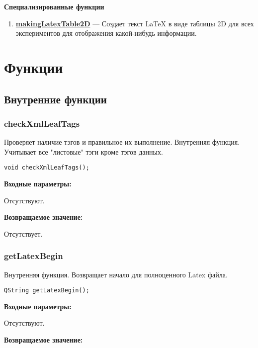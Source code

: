 \textbf{Специализированные функции}
\begin{enumerate}

\item \textbf{\hyperref[makingLatexTable2D]{makingLatexTable2D}} --- Создает текст LaTeX в виде таблицы 2D для всех экспериментов для отображения какой-нибудь информации.

\end{enumerate}


\newpage
\section{Функции}
\subsection{Внутренние функции}

\subsubsection{checkXmlLeafTags}\label{checkXmlLeafTags}

Проверяет наличие тэгов и правильное их выполнение. Внутренняя функция. Учитывает все "листовые" тэги кроме тэгов данных.


\begin{lstlisting}[label=code_syntax_checkXmlLeafTags,caption=Синтаксис]
void checkXmlLeafTags();
\end{lstlisting}

\textbf{Входные параметры:}

Отсутствуют.

\textbf{Возвращаемое значение:}

Отсутствует.


\subsubsection{getLatexBegin}\label{getLatexBegin}

Внутренняя функция. Возвращает начало для полноценного Latex файла.


\begin{lstlisting}[label=code_syntax_getLatexBegin,caption=Синтаксис]
QString getLatexBegin();
\end{lstlisting}

\textbf{Входные параметры:}

Отсутствуют.

\textbf{Возвращаемое значение:}

